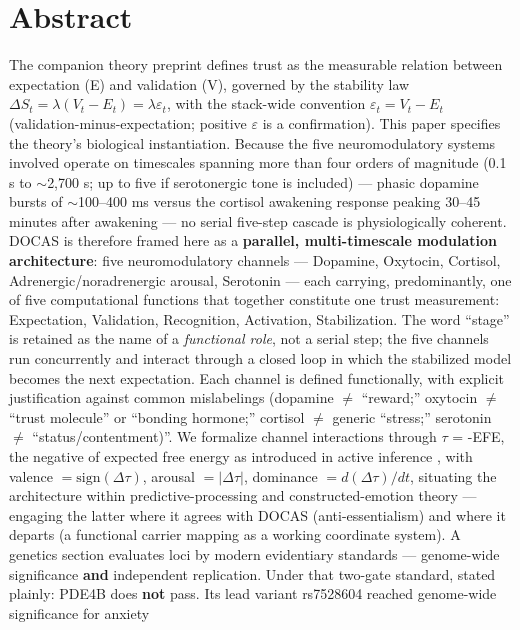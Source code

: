 \documentclass[
]{article}
\author{}
\date{}
\begin{document}
\section{Abstract}\label{abstract}

The companion theory preprint defines trust as the measurable relation
between expectation (E) and validation (V), governed by the stability
law \(\Delta S_t = \lambda(V_t - E_t) = \lambda\varepsilon_t\), with the
stack-wide convention \(\varepsilon_t = V_t - E_t\)
(validation-minus-expectation; positive \(\varepsilon\) is a
confirmation). This paper specifies the theory's biological
instantiation. Because the five neuromodulatory systems involved operate
on timescales spanning more than four orders of magnitude (0.1 s to
\(\sim\)2,700 s; up to five if serotonergic tone is included) --- phasic
dopamine bursts of \(\sim\)100--400 ms versus the cortisol awakening
response peaking 30--45 minutes after awakening --- no serial five-step
cascade is physiologically coherent. DOCAS is therefore framed here as a
\textbf{parallel, multi-timescale modulation architecture}: five
neuromodulatory channels --- Dopamine, Oxytocin, Cortisol,
Adrenergic/noradrenergic arousal, Serotonin --- each carrying,
predominantly, one of five computational functions that together
constitute one trust measurement: Expectation, Validation, Recognition,
Activation, Stabilization. The word ``stage'' is retained as the name of
a \emph{functional role}, not a serial step; the five channels run
concurrently and interact through a closed loop in which the stabilized
model becomes the next expectation. Each channel is defined
functionally, with explicit justification against common mislabelings
(dopamine \(\neq\) ``reward;'' oxytocin \(\neq\) ``trust molecule'' or
``bonding hormone;'' cortisol \(\neq\) generic ``stress;'' serotonin
\(\neq\) ``status/contentment)''. We formalize channel interactions
through \(\tau\) = -EFE, the negative of expected free energy as
introduced in active inference , with valence
\(= \mathrm{sign}(\Delta\tau)\), arousal \(= |\Delta\tau|\), dominance
\(= d(\Delta\tau)/dt\), situating the architecture within
predictive-processing and constructed-emotion theory --- engaging the
latter where it agrees with DOCAS (anti-essentialism) and where it
departs (a functional carrier mapping as a working coordinate system). A
genetics section evaluates loci by modern evidentiary standards ---
genome-wide significance \textbf{and} independent replication. Under
that two-gate standard, stated plainly: PDE4B does \textbf{not} pass.
Its lead variant rs7528604 reached genome-wide significance for anxiety
\end{document}
